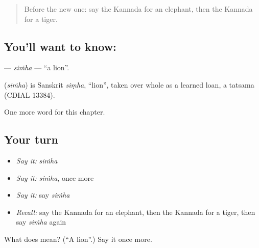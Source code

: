 \begin{quote}
Before the new one: say the Kannada for an elephant, then the Kannada for a tiger.
\end{quote}

\subsection*{You'll want to know: }
\textbf{} — \emph{siṁha} — \textquotedblleft{}a lion\textquotedblright{}.

\begin{cousinweb}
\textbf{} (\emph{siṁha}) is Sanskrit \emph{siṃha}, \textquotedblleft{}lion\textquotedblright{}, taken over whole as a learned loan, a tatsama (CDIAL 13384).
\end{cousinweb}

\begin{grammarlens}[title={What you've built}]
One more word for this chapter.
\end{grammarlens}

\subsection*{Your turn}
\begin{itemize}
\raggedright
  \item \emph{Say it:} \emph{siṁha}
  \item \emph{Say it:} \emph{siṁha}, once more
  \item \emph{Say it:} say \emph{siṁha}
  \item \emph{Recall:} say the Kannada for an elephant, then the Kannada for a tiger, then say \emph{siṁha} again
\end{itemize}

\begin{tcolorbox}[breakable,colback=teal!4,colframe=teal!35!black,title={Before you move on}]
What does  mean? (\textquotedblleft{}A lion\textquotedblright{}.) Say it once more.
\end{tcolorbox}
